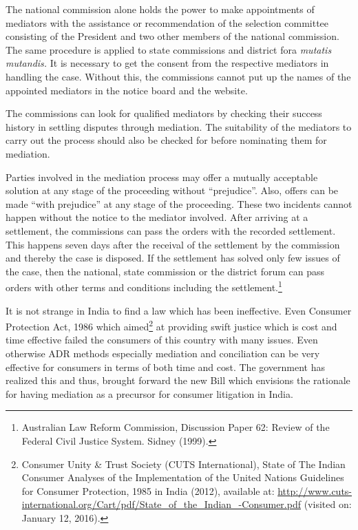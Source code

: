 \begin{multicols}{2}
\noi
The national commission alone holds the power to make appointments of mediators with the
assistance or recommendation of the selection committee consisting of the President and two
other members of the national commission. The same procedure is applied to state commissions
and district fora \textit{mutatis mutandis.} It is necessary to get the consent from the respective
mediators in handling the case. Without this, the commissions cannot put up the names of the
appointed mediators in the notice board and the website.

\noi
The commissions can look for qualified mediators by checking their success history in settling
disputes through mediation. The suitability of the mediators to carry out the process should
also be checked for before nominating them for mediation.

\noi
Parties involved in the mediation process may offer a mutually acceptable solution at any stage
of the proceeding without “prejudice”. Also, offers can be made “with prejudice” at any stage of the proceeding. These two incidents cannot happen without the notice to the mediator
involved. After arriving at a settlement, the commissions can pass the orders with the recorded
settlement. This happens seven days after the receival of the settlement by the commission and
thereby the case is disposed. If the settlement has solved only few issues of the case, then the
national, state commission or the district forum can pass orders with other terms and conditions
including the settlement.\footnote{Australian Law Reform Commission, Discussion Paper 62: Review of the Federal Civil Justice System. Sidney (1999).}


\noi
It is not strange in India to find a law which has been ineffective. Even Consumer Protection
Act, 1986 which aimed\footnote{Consumer Unity \& Trust Society (CUTS International), State of The Indian Consumer Analyses of the Implementation of the United Nations Guidelines for Consumer Protection, 1985 in India (2012), available at: \url{http://www.cuts-international.org/Cart/pdf/State_of_the_Indian_-Consumer.pdf} (visited on: January 12, 2016).} at providing swift justice which is cost and time effective failed the
consumers of this country with many issues. Even otherwise ADR methods especially
mediation and conciliation can be very effective for consumers in terms of both time and cost.
The government has realized this and thus, brought forward the new Bill which envisions the
rationale for having mediation as a precursor for consumer litigation in India.
\end{multicols}
	
\label{end2017-art5}

